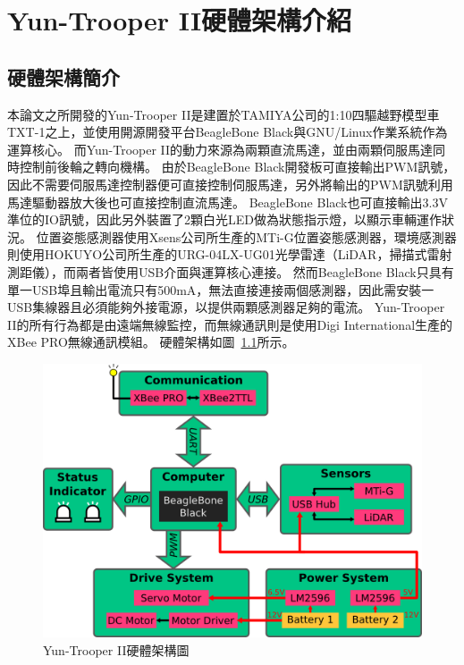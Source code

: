 \chapter{Yun-Trooper II硬體架構介紹}
\label{c:hardware}

\section{硬體架構簡介}
本論文之所開發的Yun-Trooper II是建置於TAMIYA公司的1:10四驅越野模型車TXT-1之上，並使用開源開發平台BeagleBone Black與GNU/Linux作業系統作為運算核心。
而Yun-Trooper II的動力來源為兩顆直流馬達，並由兩顆伺服馬達同時控制前後輪之轉向機構。
由於BeagleBone Black開發板可直接輸出PWM訊號，因此不需要伺服馬達控制器便可直接控制伺服馬達，另外將輸出的PWM訊號利用馬達驅動器放大後也可直接控制直流馬達。
BeagleBone Black也可直接輸出3.3V準位的IO訊號，因此另外裝置了2顆白光LED做為狀態指示燈，以顯示車輛運作狀況。
位置姿態感測器使用Xsens公司所生產的MTi-G位置姿態感測器，環境感測器則使用HOKUYO公司所生產的URG-04LX-UG01光學雷達（LiDAR，掃描式雷射測距儀），而兩者皆使用USB介面與運算核心連接。
然而BeagleBone Black只具有單一USB埠且輸出電流只有500mA，無法直接連接兩個感測器，因此需安裝一USB集線器且必須能夠外接電源，以提供兩顆感測器足夠的電流。
Yun-Trooper II的所有行為都是由遠端無線監控，而無線通訊則是使用Digi International生產的XBee PRO無線通訊模組。
硬體架構如圖~\ref{f:hardware_structure}所示。
\begin{figure}[h!]
	\centering
	\includegraphics[width=\textwidth]{figures/hardware/HardwareStructure}
	\caption{Yun-Trooper II硬體架構圖}
	\label{f:hardware_structure}
\end{figure}

